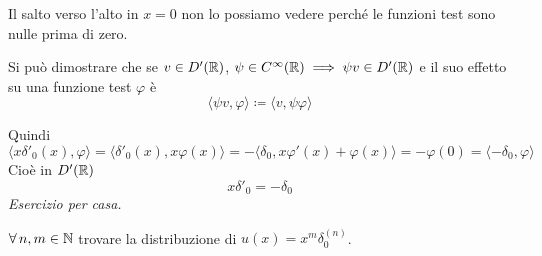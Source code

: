 Il salto verso l'alto in $x = 0$ non lo possiamo vedere perché le funzioni test sono nulle prima di zero.

\Soluzione

\begin{rem}
Si può dimostrare che se $v\in D'(\mathbb{R})$, $\psi \in C^{\infty}(\mathbb{R}) \implies \psi v\in D'(\mathbb{R})$ e il suo effetto su una funzione test $\varphi $ è
\begin{equation*}
\langle \psi v, \varphi \rangle \coloneqq \langle v, \psi \varphi \rangle
\end{equation*}
\end{rem}
Quindi
\begin{equation*}
\langle x\delta'_{0} (x), \varphi \rangle = \langle \delta'_{0} (x), x\varphi (x) \rangle = - \langle \delta_{0}, x\varphi'(x) + \varphi (x) \rangle = - \varphi (0) = \langle - \delta_{0}, \varphi \rangle
\end{equation*}
Cioè in $D'(\mathbb{R})$
\begin{equation*}
x\delta'_{0} = - \delta_{0}
\end{equation*}
\textit{Esercizio per casa.}

$\forall n, m\in \NN $ trovare la distribuzione di $u(x) = x^{m} \delta^{(n)}_{0}$.

\Soluzione

